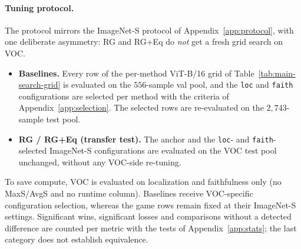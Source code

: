 \documentclass[twoside]{article}
\makeatletter
\newcommand{\1}{\mathbf{1}}
\providecommand{\captionof}[1]{\def\@captype{#1}\caption}
\makeatother
\begin{document}
\paragraph{Tuning protocol.}
The protocol mirrors the ImageNet-S protocol of Appendix~\ref{app:protocol}, with one deliberate
asymmetry: \ac{RG} and \ac{RG}+Eq do \emph{not} get a fresh grid search on VOC.
\begin{itemize}
    \item \textbf{Baselines.} Every row of the per-method ViT-B/16 grid of Table~\ref{tab:main-search-grid}
        is evaluated on the $556$-sample val pool, and the \texttt{loc} and \texttt{faith} configurations
        are selected per method with the criteria of Appendix~\ref{app:selection}. The selected rows are
        re-evaluated on the $2{,}743$-sample test pool.
    \item \textbf{\ac{RG} / \ac{RG}+Eq (transfer test).} The anchor and the \texttt{loc}- and
        \texttt{faith}-selected ImageNet-S configurations are evaluated on the VOC test pool unchanged,
        without any VOC-side re-tuning.
\end{itemize}
To save compute, VOC is evaluated on localization and faithfulness only (no MaxS/AvgS and no
runtime column). Baselines receive VOC-specific configuration selection, whereas the game rows
remain fixed at their ImageNet-S settings. Significant wins, significant losses and comparisons
without a detected difference are counted per metric with the tests of Appendix~\ref{app:stats};
the last category does not establish equivalence.

\begin{center}
    \captionof{table}{ViT-B/16 on the Pascal VOC 2012 test pool ($2{,}743$ image--class records from
    $2{,}293$ images): all rows with 95\% confidence intervals from image-cluster bootstrap resampling.
    Means are weighted over records. \ac{RG} / \ac{RG}+Eq use the ImageNet-S-selected configurations
    without re-tuning; baselines are selected on the VOC val pool. Metrics as in
    Table~\ref{tab:eval-vit}; configuration symbols and row labels: Appendix~\ref{app:config-symbols}.}
    \label{tab:eval-vit-voc}
\end{center}
\end{document}
